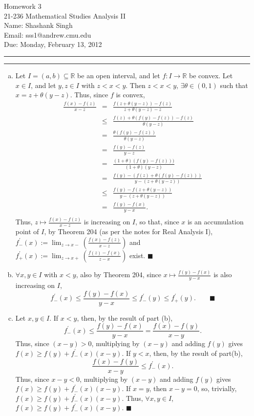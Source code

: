 \documentclass[11pt]{article}
\makeatletter
\newcounter{questionCounter}
\newcounter{partCounter}[questionCounter]
\newenvironment{question}[2][\arabic{questionCounter}]{%
    \setcounter{partCounter}{0}%
    \vspace{.25in} \hrule \vspace{0.5em}%
        \noindent{\bf #2}%
    \vspace{0.8em} \hrule \vspace{.10in}%
    \addtocounter{questionCounter}{1}%
}{}
\newcommand{\myname}{Shashank Singh}
\newcommand{\myandrew}{sss1@andrew.cmu.edu}
\newcommand{\myclass}{21-236 Mathematical Studies Analysis II}
\newcommand{\myhwnum}{3}
\newcommand{\duedate}{Monday, February 13, 2012}
\makeatother
\begin{document}
\thispagestyle{plain}

{\Large Homework \myhwnum} \\
\myclass \\
Name: \myname \\
Email: \myandrew \\
Due: \duedate

\begin{question}{Problem 1}
\begin{enumerate}[(a)]
\item Let $I = (a,b) \subseteq \mathbb{R}$ be an open interval, and let
$f: I \rightarrow \mathbb{R}$ be convex. Let $x \in I$, and
let $y, z \in I$ with $z < x < y$. Then $z < x < y$,
$\exists \theta \in (0,1)$ such that $x = z + \theta(y - z)$.
Thus, since $f$ is convex,
\begin{eqnarray*}
\frac{f(x) - f(z)}{x - z}
 & =    & \frac{f(z + \theta(y - z)) - f(z)}{z + \theta(y - z) - z} \\
 & \leq & \frac{f(z) + \theta(f(y) - f(z)) - f(z)}{\theta(y - z)} \\
 & =    & \frac{\theta(f(y) - f(z))}{\theta(y - z)} \\
 & =    & \frac{f(y) - f(z)}{y - z} \\
 & =    & \frac{(1 + \theta)(f(y) - f(z)))}{(1 + \theta)(y - z)} \\
 & =    & \frac{f(y) - (f(z) + \theta(f(y) - f(z)))}{y - (z + \theta(y - z))} \\
 & \leq & \frac{f(y) - f(z + \theta(y - z))}{y - (z + \theta(y - z))} \\
 & =    & \frac{f(y) - f(x)}{y - x}. \\
\end{eqnarray*}
Thus, $z \mapsto \frac{f(x) - f(z)}{x - z}$ is increasing on $I$, so that,
since $x$ is an accumulation point of $I$, by Theorem 204 (as per the notes
for Real Analysis I),
$f_-^{\prime}(x)
 := \lim_{z \rightarrow x-} \left(\frac{f(x) - f(z)}{x - z}\right)$ and
$f_+^{\prime}(x)
 := \lim_{z \rightarrow x+} \left(\frac{f(z) - f(x)}{z - x}\right)$
exist. \qquad $\blacksquare$

\item $\forall x,y \in I$ with $x < y$, also by Theorem 204, since
$x \mapsto \frac{f(y) - f(x)}{y - x}$ is also increasing on $I$,
\[f_-^{\prime}(x) \leq \frac{f(y) - f(x)}{y - x} \leq f_-^{\prime}(y)
\leq f_+^{\prime}(y). \qquad \blacksquare\]

\item Let $x,y \in I$. If $x < y$, then, by the result of part (b),
\[f^{\prime}_-(x) \leq \frac{f(y) - f(x)}{y - x}
= \frac{f(x) - f(y)}{x - y}.\] Thus, since $(x - y) > 0$, multiplying by
$(x - y)$ and adding $f(y)$ gives
$f(x) \geq f(y) + f^{\prime}_- (x) (x - y)$.
If $y < x$, then, by the result
of part(b), \[\frac{f(x) - f(y)}{x - y} \leq f^{\prime}_- (x).\] Thus, since
$x - y < 0$, multiplying by $(x - y)$ and adding $f(y)$ gives
$f(x) \geq f(y) + f^{\prime}_- (x) (x - y)$.
If $x = y$, then $x - y = 0$, so, trivially,
$f(x) \geq f(y) + f^{\prime}_-(x)  (x - y)$.
Thus, $\forall x, y \in I$, $f(x) \geq f(y) + f^{\prime}_- (x) (x - y).$ \qquad
$\blacksquare$


\end{enumerate}
\end{question}
\end{document}

